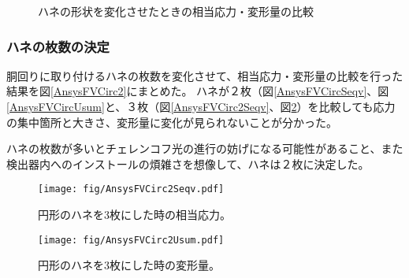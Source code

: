 \documentclass[11pt]{ltjsreport}
\newcommand{\figref}[1]{図\ref{#1}}
\begin{document}
\begin{figure}[htbp]
  \begin{minipage}{0.47\textwidth}
  \end{minipage}
  \hfill
  \begin{minipage}{0.47\textwidth}
  \end{minipage}
  \hfill
  \begin{minipage}{0.47\textwidth}
  \end{minipage}
  \hfill \begin{minipage}{0.47\textwidth}
  \end{minipage}
    \caption{ハネの形状を変化させたときの相当応力・変形量の比較}
  \label{AnsysFVSqCirc}
\end{figure}

\subsubsection{ハネの枚数の決定}
胴回りに取り付けるハネの枚数を変化させて、相当応力・変形量の比較を行った結果を\figref{AnsysFVCirc2}にまとめた。
ハネが２枚（\figref{AnsysFVCircSeqv}、\figref{AnsysFVCircUsum}と、３枚（\figref{AnsysFVCirc2Seqv}、\figref{AnsysFVCirc2Usum}）を比較しても応力の集中箇所と大きさ、変形量に変化が見られないことが分かった。

ハネの枚数が多いとチェレンコフ光の進行の妨げになる可能性があること、また検出器内へのインストールの煩雑さを想像して、ハネは２枚に決定した。

\begin{figure}[htbp]
\begin{minipage}{0.47\textwidth}
\centering
\texttt{[image: fig/AnsysFVCirc2Seqv.pdf]}
\caption[円形のハネを3枚にした時の相当応力]{円形のハネを3枚にした時の相当応力。}
\label{AnsysFVCirc2Seqv}
\end{minipage}
\hfill
\begin{minipage}{0.47\textwidth}
\centering
\texttt{[image: fig/AnsysFVCirc2Usum.pdf]}
\caption[円形のハネを3枚にした時の変形量]{円形のハネを3枚にした時の変形量。}
\label{AnsysFVCirc2Usum}
\end{minipage}
\end{figure}
\fi%
\end{document}
